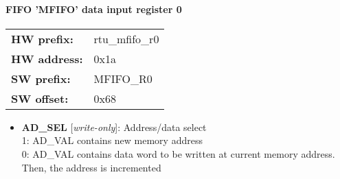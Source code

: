 \paragraph*{FIFO 'MFIFO' data input register 0}\vspace{12pt}

\begin{tabular}{l l }
{\bf HW prefix:}  & rtu\_mfifo\_r0\\
{\bf HW address:}  & 0x1a\\
{\bf SW prefix:}  & MFIFO\_R0\\
{\bf SW offset:}  & 0x68\\
\end{tabular}


\vspace{12pt}
\noindent
{}

\begin{itemize}
\item \begin{small}
{\bf 
AD\_SEL
} [\emph{write-only}]: Address/data select
\\
1: AD\_VAL contains new memory address\\				               0: AD\_VAL contains data word to be written at current memory address. Then, the address is incremented
\end{small}
\end{itemize}
